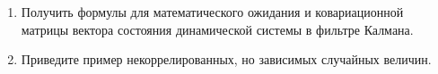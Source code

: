 \documentclass[a4paper,12pt]{extreport}
\renewcommand{\=}[1]{\stackrel{#1}{=}} %
\newcommand{\Expect}{\mathop{{}\mathrm{E}}}
\begin{document}
\begin{enumerate}


    \item Получить формулы для математического ожидания и ковариационной матрицы
    вектора состояния динамической системы в фильтре Калмана.

    \item Приведите пример некоррелированных, но зависимых случайных величин.


    

\end{enumerate}
\end{document}
